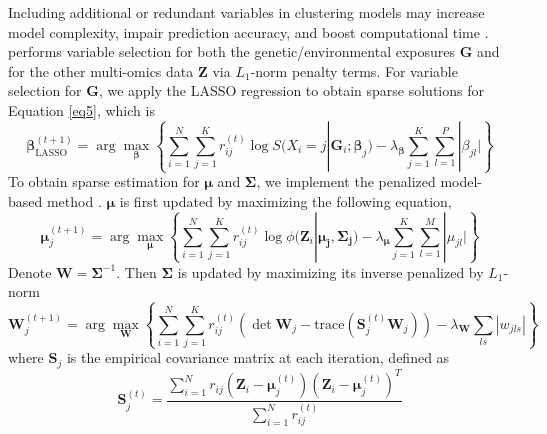 Including additional or redundant variables in clustering models may increase model complexity, impair prediction accuracy, and boost computational time \citep{fop2018variable}.  performs variable selection for both the genetic/environmental exposures $\bm G$ and for the other multi-omics data $\bm Z$ via $L_1$-norm penalty terms. For variable selection for $\bm G$, we apply the LASSO regression to obtain sparse solutions for Equation \ref{eq5}, which is
\begin{equation}
     \bm{\beta}_{\text{LASSO}}^{(t+1)} = \arg \max_{\bm{\beta}} \left\{ \sum_{i = 1}^N \sum_{j = 1}^K r_{ij}^{(t)}\log S(X_i = j | \bm{G}_i; \bm{\beta}_j) - \lambda_{\bm{\beta}}\sum_{j = 1}^K\sum_{l = 1}^P |\beta_{jl}| \right\}
     \label{eq14}
\end{equation}
To obtain sparse estimation for $\bm \mu$ and $\bm \Sigma$, we implement the penalized model-based method \citep{zhou2009penalized}. $\bm \mu$ is first updated by maximizing the following equation,
\begin{equation}
    \bm{\mu}_j^{(t+1)} = \arg \max_{\bm \mu} \left \{ \sum_{i = 1}^N \sum_{j = 1}^K r_{ij}^{(t)}\log \phi(\bm{Z}_i| \bm{\mu_j}, \bm{\Sigma_j}) - \lambda_{\bm{\mu}}\sum_{j = 1}^K\sum_{l = 1}^M |\mu_{jl}| \right \}
    \label{eq15}
\end{equation}
Denote $\bm{W} = \bm{\Sigma}^{-1}$. Then $\bm \Sigma$ is updated by maximizing its inverse penalized by $L_1$-norm
\begin{equation}
    \bm{W}_j^{(t+1)} = \arg \max_{\bm W} \left \{ \sum_{i = 1}^N \sum_{j = 1}^K r_{ij}^{(t)}\left( \det \bm{W}_j - \text{trace}(\bm{S}_j^{(t)} \bm{W}_j) \right) - \lambda_{\bm{W}}\sum_{ls}|w_{jls}| \right \}
    \label{eq16}
\end{equation}
where $\bm S_j$ is the empirical covariance matrix at each iteration, defined as 
\begin{equation}
    \bm{S}_j^{(t)} = \frac{\sum_{i=1}^N r_{ij}\left(\bm{Z}_i - \bm{\mu}_j^{(t)}\right)\left(\bm{Z}_i - \bm{\mu}_j^{(t)}\right)^T}{\sum_{i=1}^N r_{ij}^{(t)}}
    \label{eq17}
\end{equation}

